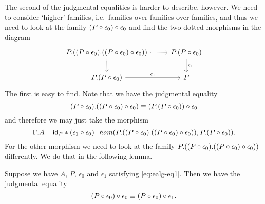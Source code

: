 The second of the judgmental equalities is harder to describe, however. We need
to consider `higher' families, i.e.~families over families over families, and
thus we need to look at the family $\jcomp{}{\epsilon_0}{\jcomp{}{\epsilon_0}{P}}$ and find the
two dotted morphisms in the diagram
\begin{equation*}
\begin{tikzcd}
\ctxext{P}{{\jcomp{}{\epsilon_0}{P}}{\jcomp{}{\epsilon_0}{\jcomp{}{\epsilon_0}{P}}}}
  \ar[densely dotted]{d}
  \ar[densely dotted]{r}
& \ctxext{P}{\jcomp{}{\epsilon_0}{P}} \ar{d}{\epsilon_1}\\
\ctxext{P}{\jcomp{}{\epsilon_0}{P}} \ar{r}{\epsilon_1} & P
\end{tikzcd}
\end{equation*}
The first is easy to find. Note that we have the judgmental equality
\begin{equation*}
\ctxext{\jcomp{}{\epsilon_0}{P}}{\jcomp{}{\epsilon_0}{\jcomp{}{\epsilon_0}{P}}}
  \jdeq
  \jcomp{}{\epsilon_0}{\ctxext{P}{\jcomp{}{\epsilon_0}{P}}}
\end{equation*}
and therefore we may just take the morphism
\begin{equation*}
\jhom
  {{\Gamma}{A}}
  {{P}{{\jcomp{}{\epsilon_0}{P}}{\jcomp{}{\epsilon_0}{\jcomp{}{\epsilon_0}{P}}}}}
  {{P}{\jcomp{}{\epsilon_0}{P}}}
  {\jvcomp{}{\idtm{P}}{\jcomp{}{\epsilon_0}{\epsilon_1}}}.
\end{equation*}
For the other morphism we need to look at the family
$\ctxext{P}{{\jcomp{}{\epsilon_0}{P}}{\jcomp{}{\epsilon_0}{\jcomp{}{\epsilon_0}{P}}}}$ differently. We do
that in the following lemma.

\begin{lem}
Suppose we have $A$, $P$, $\epsilon_0$ and $\epsilon_1$ satisfying \autoref{eq:ealg-eq1}. Then
we have the judgmental equality
\begin{equation*}
\jcomp{}{\epsilon_0}{\jcomp{}{\epsilon_0}{P}}
  \jdeq
  \jcomp{}{\epsilon_1}{\jcomp{}{\epsilon_0}{P}}.
\end{equation*}
\end{lem}

